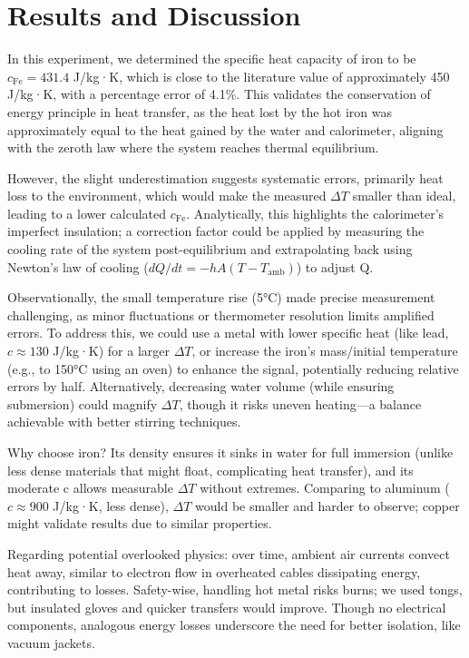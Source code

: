 \documentclass[12pt, a4paper]{article}
\begin{document}
\section{Results and Discussion}
In this experiment, we determined the specific heat capacity of iron to be $c_{\text{Fe}} = 431.4$ J/kg·K, which is close to the literature value of approximately 450 J/kg·K, with a percentage error of 4.1\%. This validates the conservation of energy principle in heat transfer, as the heat lost by the hot iron was approximately equal to the heat gained by the water and calorimeter, aligning with the zeroth law where the system reaches thermal equilibrium.

However, the slight underestimation suggests systematic errors, primarily heat loss to the environment, which would make the measured $\Delta T$ smaller than ideal, leading to a lower calculated $c_{\text{Fe}}$. Analytically, this highlights the calorimeter's imperfect insulation; a correction factor could be applied by measuring the cooling rate of the system post-equilibrium and extrapolating back using Newton's law of cooling ($dQ/dt = -hA (T - T_{\text{amb}})$) to adjust Q.

Observationally, the small temperature rise (5°C) made precise measurement challenging, as minor fluctuations or thermometer resolution limits amplified errors. To address this, we could use a metal with lower specific heat (like lead, $c \approx 130$ J/kg·K) for a larger $\Delta T$, or increase the iron's mass/initial temperature (e.g., to 150°C using an oven) to enhance the signal, potentially reducing relative errors by half. Alternatively, decreasing water volume (while ensuring submersion) could magnify $\Delta T$, though it risks uneven heating---a balance achievable with better stirring techniques.

Why choose iron? Its density ensures it sinks in water for full immersion (unlike less dense materials that might float, complicating heat transfer), and its moderate c allows measurable $\Delta T$ without extremes. Comparing to aluminum ($c \approx 900$ J/kg·K, less dense), $\Delta T$ would be smaller and harder to observe; copper might validate results due to similar properties.

Regarding potential overlooked physics: over time, ambient air currents convect heat away, similar to electron flow in overheated cables dissipating energy, contributing to losses. Safety-wise, handling hot metal risks burns; we used tongs, but insulated gloves and quicker transfers would improve. Though no electrical components, analogous energy losses underscore the need for better isolation, like vacuum jackets.
\end{document}
